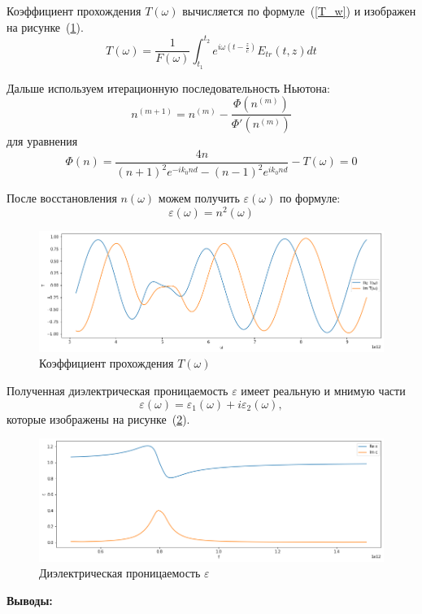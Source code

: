 Коэффициент прохождения $T(\omega)$ вычисляется по формуле~(\ref{T_w}) и изображен на рисунке~(\ref{fig:T_w}).
\begin{equation}\label{T_w}
    T(\omega) = \frac{1}{F(\omega)} \int_{t_1}^{t_2} e^{i\omega(t-\frac{z}{c})} E_{tr}(t,z)dt
\end{equation}

Дальше используем итерационную последовательность Ньютона:
\begin{equation}
    n^{(m+1)} = n^{(m)} - \frac{\Phi(n^{(m)})}{\Phi'(n^{(m)})}
\end{equation}
для уравнения
\begin{equation}\label{F_w}
    \Phi(n) = \frac{4 n}{(n+1)^2e^{-ik_0nd} - (n-1)^2e^{ik_0nd}} - T(\omega) = 0
\end{equation}

После восстановления $n(\omega)$ можем получить $\varepsilon(\omega)$ по формуле:
\begin{equation}
    \varepsilon(\omega) = n^2(\omega)
\end{equation}


\begin{figure}[ht!]
    \centering
    \includegraphics[width=\linewidth]{Figures/T_w.png}
    \caption{Коэффициент прохождения $T(\omega)$}
    \label{fig:T_w}
\end{figure}

Полученная диэлектрическая проницаемость $\varepsilon$ имеет реальную и мнимую части
\begin{equation}
    \varepsilon(\omega) = \varepsilon_1(\omega) + i\varepsilon_2(\omega),
\end{equation}
которые изображены на рисунке~(\ref{fig:epsilon}).

\begin{figure}[h!]
    \centering
    \includegraphics[width=\linewidth]{Figures/epsilon.png}
    \caption{Диэлектрическая проницаемость $\varepsilon$}
    \label{fig:epsilon}
\end{figure}
\newpage
\textbf{Выводы:}

